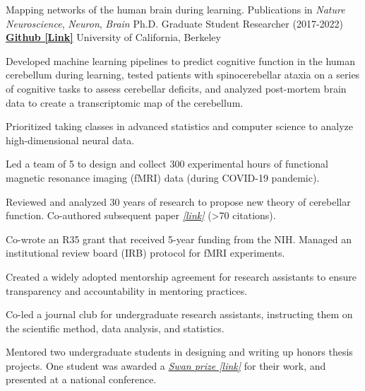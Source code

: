 \begin{cventries}
  \cventry
  	{Mapping networks of the human brain during learning. Publications in \textit{Nature Neuroscience}, \textit{Neuron}, \textit{Brain}}
    {Ph.D. Graduate Student Researcher (2017-2022)} %
    {\href{https://github.com/maedbhk/cerebellum_learning_connect}{\textbf{Github [Link]}}}
    {University of California, Berkeley} %
    {
      \begin{cvitems} %
        \item {Developed machine learning pipelines to predict cognitive function in the human cerebellum during learning, tested patients with spinocerebellar ataxia on a series of cognitive tasks to assess cerebellar deficits, and analyzed post-mortem brain data to create a transcriptomic map of the cerebellum.}
        \item {Prioritized taking classes in advanced statistics and computer science to analyze high-dimensional neural data.} 
        \item {Led a team of 5 to design and collect 300 experimental hours of functional magnetic resonance imaging (fMRI) data (during COVID-19 pandemic).}
		\item {Reviewed and analyzed 30 years of research to propose new theory of cerebellar function. Co-authored subsequent paper \href{https://www.sciencedirect.com/science/article/pii/S0896627319303782}{\textit{[link]}} (>70 citations).}
        \item {Co-wrote an R35 grant that received 5-year funding from the NIH. Managed an institutional review board (IRB) protocol for fMRI experiments.}
        \item {Created a widely adopted mentorship agreement for research assistants to ensure transparency and accountability in mentoring practices.}
        \item {Co-led a journal club for undergraduate research assistants, instructing them on the scientific method, data analysis, and statistics.}
        \item {Mentored two undergraduate students in designing and writing up honors thesis projects. One student was awarded a \href{https://psychology.berkeley.edu/sites/default/files/undergraduate-program/swanaward_application_2019-2020.pdf}{\textit{Swan prize [link]}} for their work, and presented at a national conference.}
      \end{cvitems}
    }
    

\end{cventries}
